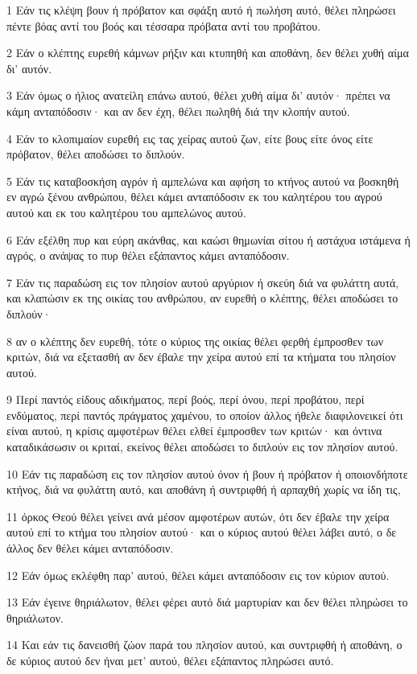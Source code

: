 \par 1 Εάν τις κλέψη βουν ή πρόβατον και σφάξη αυτό ή πωλήση αυτό, θέλει πληρώσει πέντε βόας αντί του βοός και τέσσαρα πρόβατα αντί του προβάτου.
\par 2 Εάν ο κλέπτης ευρεθή κάμνων ρήξιν και κτυπηθή και αποθάνη, δεν θέλει χυθή αίμα δι' αυτόν.
\par 3 Εάν όμως ο ήλιος ανατείλη επάνω αυτού, θέλει χυθή αίμα δι' αυτόν· πρέπει να κάμη ανταπόδοσιν· και αν δεν έχη, θέλει πωληθή διά την κλοπήν αυτού.
\par 4 Εάν το κλοπιμαίον ευρεθή εις τας χείρας αυτού ζων, είτε βους είτε όνος είτε πρόβατον, θέλει αποδώσει το διπλούν.
\par 5 Εάν τις καταβοσκήση αγρόν ή αμπελώνα και αφήση το κτήνος αυτού να βοσκηθή εν αγρώ ξένου ανθρώπου, θέλει κάμει ανταπόδοσιν εκ του καλητέρου του αγρού αυτού και εκ του καλητέρου του αμπελώνος αυτού.
\par 6 Εάν εξέλθη πυρ και εύρη ακάνθας, και καώσι θημωνίαι σίτου ή αστάχυα ιστάμενα ή αγρός, ο ανάψας το πυρ θέλει εξάπαντος κάμει ανταπόδοσιν.
\par 7 Εάν τις παραδώση εις τον πλησίον αυτού αργύριον ή σκεύη διά να φυλάττη αυτά, και κλαπώσιν εκ της οικίας του ανθρώπου, αν ευρεθή ο κλέπτης, θέλει αποδώσει το διπλούν·
\par 8 αν ο κλέπτης δεν ευρεθή, τότε ο κύριος της οικίας θέλει φερθή έμπροσθεν των κριτών, διά να εξετασθή αν δεν έβαλε την χείρα αυτού επί τα κτήματα του πλησίον αυτού.
\par 9 Περί παντός είδους αδικήματος, περί βοός, περί όνου, περί προβάτου, περί ενδύματος, περί παντός πράγματος χαμένου, το οποίον άλλος ήθελε διαφιλονεικεί ότι είναι αυτού, η κρίσις αμφοτέρων θέλει ελθεί έμπροσθεν των κριτών· και όντινα καταδικάσωσιν οι κριταί, εκείνος θέλει αποδώσει το διπλούν εις τον πλησίον αυτού.
\par 10 Εάν τις παραδώση εις τον πλησίον αυτού όνον ή βουν ή πρόβατον ή οποιονδήποτε κτήνος, διά να φυλάττη αυτό, και αποθάνη ή συντριφθή ή αρπαχθή χωρίς να ίδη τις,
\par 11 όρκος Θεού θέλει γείνει ανά μέσον αμφοτέρων αυτών, ότι δεν έβαλε την χείρα αυτού επί το κτήμα του πλησίον αυτού· και ο κύριος αυτού θέλει λάβει αυτό, ο δε άλλος δεν θέλει κάμει ανταπόδοσιν.
\par 12 Εάν όμως εκλέφθη παρ' αυτού, θέλει κάμει ανταπόδοσιν εις τον κύριον αυτού.
\par 13 Εάν έγεινε θηριάλωτον, θέλει φέρει αυτό διά μαρτυρίαν και δεν θέλει πληρώσει το θηριάλωτον.
\par 14 Και εάν τις δανεισθή ζώον παρά του πλησίον αυτού, και συντριφθή ή αποθάνη, ο δε κύριος αυτού δεν ήναι μετ' αυτού, θέλει εξάπαντος πληρώσει αυτό.
